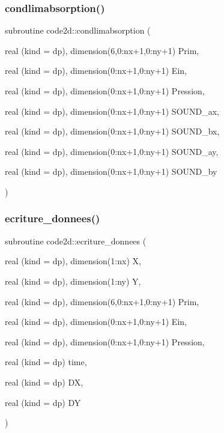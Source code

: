 \mbox{\label{main2Dv1_8f90_a4fa8d6d2b6084471f67e67e44694e3a7}} 
\subsubsection{\texorpdfstring{condlimabsorption()}{condlimabsorption()}}
{\footnotesize\ttfamily subroutine code2d\+::condlimabsorption (\begin{DoxyParamCaption}\item[{real (kind = dp), dimension(6,0\+:nx+1,0\+:ny+1)}]{Prim,  }\item[{real (kind = dp), dimension(0\+:nx+1,0\+:ny+1)}]{Ein,  }\item[{real (kind = dp), dimension(0\+:nx+1,0\+:ny+1)}]{Pression,  }\item[{real (kind = dp), dimension(0\+:nx+1,0\+:ny+1)}]{S\+O\+U\+N\+D\+\_\+ax,  }\item[{real (kind = dp), dimension(0\+:nx+1,0\+:ny+1)}]{S\+O\+U\+N\+D\+\_\+bx,  }\item[{real (kind = dp), dimension(0\+:nx+1,0\+:ny+1)}]{S\+O\+U\+N\+D\+\_\+ay,  }\item[{real (kind = dp), dimension(0\+:nx+1,0\+:ny+1)}]{S\+O\+U\+N\+D\+\_\+by }\end{DoxyParamCaption})}

\mbox{\label{main2Dv1_8f90_ab888aad3d30c4051f2c622bac7a2a934}} 
\subsubsection{\texorpdfstring{ecriture\+\_\+donnees()}{ecriture\_donnees()}}
{\footnotesize\ttfamily subroutine code2d\+::ecriture\+\_\+donnees (\begin{DoxyParamCaption}\item[{real (kind = dp), dimension(1\+:nx)}]{X,  }\item[{real (kind = dp), dimension(1\+:ny)}]{Y,  }\item[{real (kind = dp), dimension(6,0\+:nx+1,0\+:ny+1)}]{Prim,  }\item[{real (kind = dp), dimension(0\+:nx+1,0\+:ny+1)}]{Ein,  }\item[{real (kind = dp), dimension(0\+:nx+1,0\+:ny+1)}]{Pression,  }\item[{real (kind = dp)}]{time,  }\item[{real (kind = dp)}]{DX,  }\item[{real (kind = dp)}]{DY }\end{DoxyParamCaption})}

